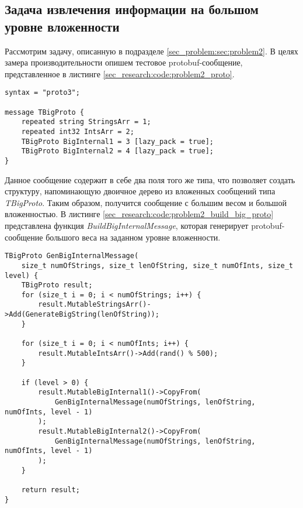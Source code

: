 \subsection{Задача извлечения информации на большом уровне вложенности}

Рассмотрим задачу, описанную в подразделе \ref{sec_problem:sec:problem2}.
В целях замера производительности опишем тестовое protobuf-сообщение, представленное в листинге \ref{sec_research:code:problem2_proto}.

\noindent\begin{minipage}{\linewidth}
\begin{lstlisting}[style=CodeListing, caption={Тестовое protobuf-сообщение}, label=sec_research:code:problem2_proto]
syntax = "proto3";

message TBigProto {
    repeated string StringsArr = 1;
    repeated int32 IntsArr = 2;
    TBigProto BigInternal1 = 3 [lazy_pack = true];
    TBigProto BigInternal2 = 4 [lazy_pack = true];
}
\end{lstlisting}
\end{minipage}

Данное сообщение содержит в себе два поля того же типа, что позволяет создать структуру, напоминающую двоичное дерево из вложенных сообщений типа \textit{TBigProto}.
Таким образом, получится сообщение с большим весом и большой вложенностью.
В листинге \ref{sec_research:code:problem2_build_big_proto} представлена функция \textit{BuildBigInternalMessage}, которая генерирует protobuf-сообщение большого веса на заданном уровне вложенности.

\noindent\begin{minipage}{\linewidth}
\begin{lstlisting}[style=CodeListing, caption={Функция BuildBigInternalMessage}, label=sec_research:code:problem2_build_big_proto]
TBigProto GenBigInternalMessage(
    size_t numOfStrings, size_t lenOfString, size_t numOfInts, size_t level) {
    TBigProto result;
    for (size_t i = 0; i < numOfStrings; i++) {
        result.MutableStringsArr()->Add(GenerateBigString(lenOfString));
    }

    for (size_t i = 0; i < numOfInts; i++) {
        result.MutableIntsArr()->Add(rand() % 500);
    }

    if (level > 0) {
        result.MutableBigInternal1()->CopyFrom(
            GenBigInternalMessage(numOfStrings, lenOfString, numOfInts, level - 1)
        );
        result.MutableBigInternal2()->CopyFrom(
            GenBigInternalMessage(numOfStrings, lenOfString, numOfInts, level - 1)
        );
    }

    return result;
}
\end{lstlisting}
\end{minipage}

